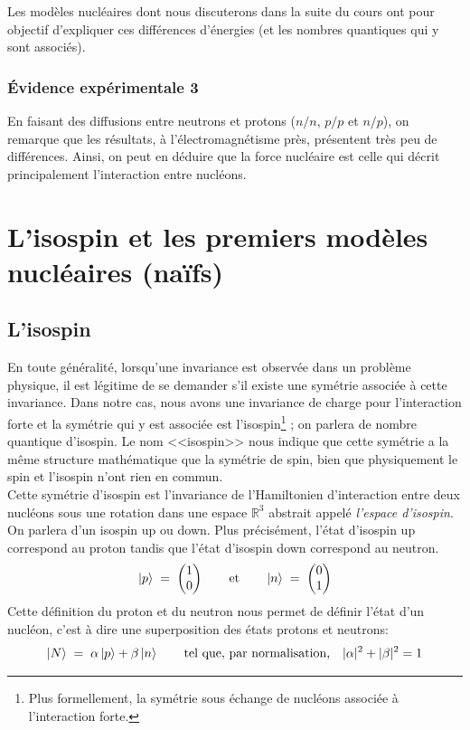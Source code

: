 Les modèles nucléaires dont nous discuterons dans la suite du cours ont pour objectif d'expliquer ces différences d'énergies (et les nombres quantiques qui y sont associés).


\subsubsection{Évidence expérimentale 3}


En faisant des diffusions entre neutrons et protons ($n/n$, $p/p$ et $n/p$), on remarque que les résultats, à l'électromagnétisme près, présentent très peu de différences. Ainsi, on peut en déduire que la force nucléaire est celle qui décrit principalement l'interaction entre nucléons.






\section{L'isospin et les premiers modèles nucléaires (naïfs)}

\subsection{L'isospin}

En toute généralité, lorsqu'une invariance est observée dans un problème physique, il est légitime de se demander s'il existe une symétrie associée à cette invariance. Dans notre cas, nous avons une invariance de charge pour l'interaction forte et la symétrie qui y est associée est l'isospin\footnote{Plus formellement, la symétrie sous échange de nucléons associée à l'interaction forte.} ; on parlera de nombre quantique d'isospin. Le nom <<isospin>> nous indique que cette symétrie a la même structure mathématique que la symétrie de spin, bien que physiquement le spin et l'isospin n'ont rien en commun.\\

Cette symétrie d'isospin est l'invariance de l'Hamiltonien d'interaction entre deux nucléons sous une rotation dans une espace $\mathbb{R}^3$ abstrait appelé \textit{l'espace d'isospin}. On parlera d'un isospin up ou down. Plus précisément, l'état d'isospin up correspond au proton tandis que l'état d'isospin down correspond au neutron.
\begin{equation*}
    \ket{p} \; = \; 
    \begin{pmatrix}
    1 \\ 0
    \end{pmatrix}
    \qquad \text{et}\qquad
    \ket{n} \; = \; 
    \begin{pmatrix}
    0 \\ 1
    \end{pmatrix}
\end{equation*}
Cette définition du proton et du neutron nous permet de définir l'état d'un nucléon, c'est à dire une superposition des états protons et neutrons:
\begin{equation*}
    \ket{N} \; = \; \alpha \ket{p} + \beta\ket{n}
    \qquad \text{tel que, par normalisation,} \quad
    |\alpha|^2+|\beta|^2=1
\end{equation*}

